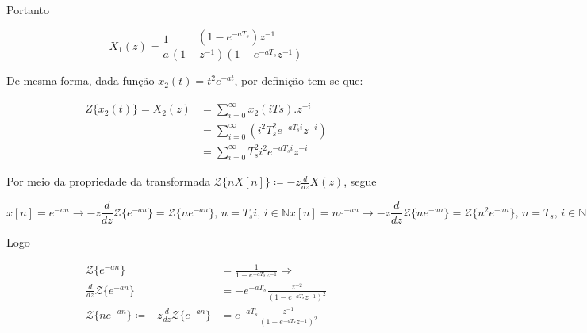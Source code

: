 \documentclass[twoside, fleqn]{article}
\begin{document}
\begin{enumerate}
        Portanto
        	
        	\begin{equation}
            	X_1(z) = \frac{1}{a}  \frac{(1 - e^{-aT_s})z^{-1}}{(1-z^{-1})(1-e^{-aT_s} z^ {-1})}
        	\end{equation}
        
        De mesma forma, dada função $x_2(t) = t^2 e^{-a t}$, por definição tem-se que:
        
        	\begin{equation}
            	\begin{split}
                	Z\{x_2(t)\} = X_2(z) & = \sum_{i=0}^{\infty} x_2(i Ts).z^{-i} \\
                	& = \sum_{i=0}^{\infty} \left( i^2 T_s^2 e^{-a T_s i} z^{-i} \right) \\
                	& = \sum_{i=0}^{\infty} T_s^2 i^2 e^{-a T_s i} z^{-i}
            	\end{split}
        	\end{equation}
        	
        Por meio da propriedade da transformada $\mathcal{Z}\{n X[n]\} \coloneqq -z \frac{d}{dz} X(z)$, segue
        
            \begin{subequations}
                \begin{equation}
                    x[n] = e^{-an} \rightarrow -z \frac{d}{dz} \mathcal{Z}\{e^{-an}\} = \mathcal{Z}\{n e^{-an}\} \mbox{, } n = T_s i \mbox{, } i \in \mathbb{N}
                \end{equation}
                \begin{equation}
                    x[n] = n e^{-an} \rightarrow -z \frac{d}{dz} \mathcal{Z}\{n e^{-an}\} = \mathcal{Z}\{n^2 e^{-an}\} \mbox{, } n = T_s \mbox{, } i \in \mathbb{N}
                \end{equation}
            \end{subequations}
        
        Logo
        
            \begin{equation}
                \begin{split}
                    \mathcal{Z}\{e^{-an}\} & = \frac{1}{1 - e^{-a T_s} z^{-1}} \Rightarrow \\
                    \frac{d}{dz} \mathcal{Z}\{e^{-an}\} & = - e^{-a T_s} \frac{z^{-2}}{(1 - e^{-a T_s} z^{-1})^2} \\
                    \mathcal{Z}\{n e^{-an}\} \coloneqq -z \frac{d}{dz} \mathcal{Z}\{e^{-an}\} & = e^{-a T_s} \frac{z^{-1}}{(1 - e^{-a T_s} z^{-1})^2}
                \end{split}
            \end{equation}
        

\end{enumerate}
\end{document}
